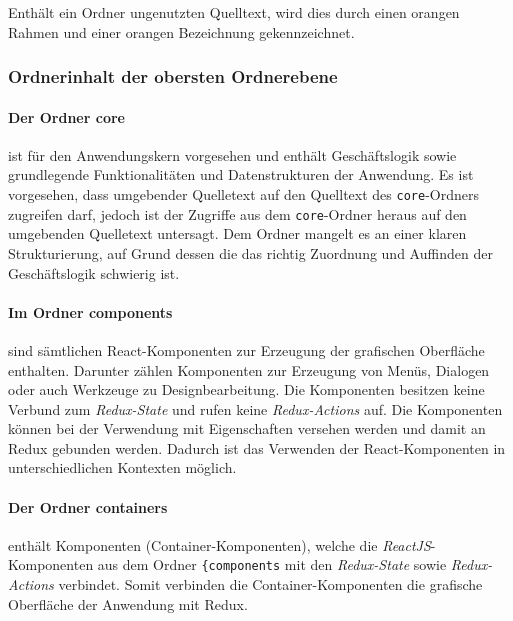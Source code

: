 Enthält ein Ordner ungenutzten Quelltext, wird dies durch einen orangen Rahmen und einer orangen Bezeichnung gekennzeichnet.

\subsubsection{Ordnerinhalt der obersten Ordnerebene}
\paragraph{Der Ordner core} ist für den Anwendungskern vorgesehen und enthält Geschäftslogik sowie grundlegende Funktionalitäten und Datenstrukturen der Anwendung. 
Es ist vorgesehen, dass umgebender Quelletext auf den Quelltext des \lstinline|core|-Ordners zugreifen darf, jedoch ist der Zugriffe aus dem \lstinline|core|-Ordner heraus auf den umgebenden Quelletext untersagt. Dem Ordner mangelt es an einer klaren Strukturierung, auf Grund dessen die das richtig Zuordnung und Auffinden der Geschäftslogik schwierig ist. 

\paragraph{Im Ordner components} sind sämtlichen React-Komponenten zur Erzeugung der grafischen Oberfläche enthalten. Darunter zählen Komponenten zur Erzeugung von Menüs, Dialogen oder auch Werkzeuge zu Designbearbeitung. Die Komponenten besitzen keine Verbund zum \emph{Redux-State} und rufen keine \emph{Redux-Actions} auf. Die Komponenten können bei der Verwendung mit Eigenschaften versehen werden und damit an Redux gebunden werden. Dadurch ist das Verwenden der React-Komponenten in unterschiedlichen Kontexten möglich.

\paragraph{Der Ordner containers} enthält Komponenten (Container-Komponenten), welche die \emph{ReactJS}-Komponenten aus dem Ordner \lstinline|{components| mit den \emph{Redux-State} sowie \emph{Redux-Actions} verbindet. Somit verbinden die Container-Komponenten die grafische Oberfläche der Anwendung mit Redux.



